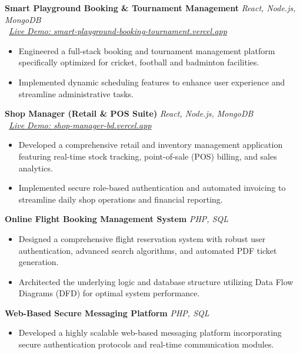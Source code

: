 \documentclass[11pt,letterpaper]{article}
\begin{document}
\vspace{4pt}
\noindent \textbf{Smart Playground Booking \& Tournament Management} \hfill \textit{React, Node.js, MongoDB} \\
\textit{\small \faGlobe\ \href{https://smart-playground-booking-tournament.vercel.app/login.html}{Live Demo: smart-playground-booking-tournament.vercel.app}}
\begin{itemize}
    \item Engineered a full-stack booking and tournament management platform specifically optimized for cricket, football and badminton facilities.
    \item Implemented dynamic scheduling features to enhance user experience and streamline administrative tasks.
\end{itemize}

\vspace{4pt}
\noindent \textbf{Shop Manager (Retail \& POS Suite)} \hfill \textit{React, Node.js, MongoDB} \\
\textit{\small \faGlobe\ \href{https://shop-manager-bd.vercel.app/}{Live Demo: shop-manager-bd.vercel.app}}
\begin{itemize}
    \item Developed a comprehensive retail and inventory management application featuring real-time stock tracking, point-of-sale (POS) billing, and sales analytics.
    \item Implemented secure role-based authentication and automated invoicing to streamline daily shop operations and financial reporting.
\end{itemize}

\vspace{4pt}
\noindent \textbf{Online Flight Booking Management System} \hfill \textit{PHP, SQL}
\begin{itemize}
    \item Designed a comprehensive flight reservation system with robust user authentication, advanced search algorithms, and automated PDF ticket generation.
    \item Architected the underlying logic and database structure utilizing Data Flow Diagrams (DFD) for optimal system performance.
\end{itemize}

\vspace{4pt}
\noindent \textbf{Web-Based Secure Messaging Platform} \hfill \textit{PHP, SQL}
\begin{itemize}
    \item Developed a highly scalable web-based messaging platform incorporating secure authentication protocols and real-time communication modules.
\end{itemize}
\end{document}

